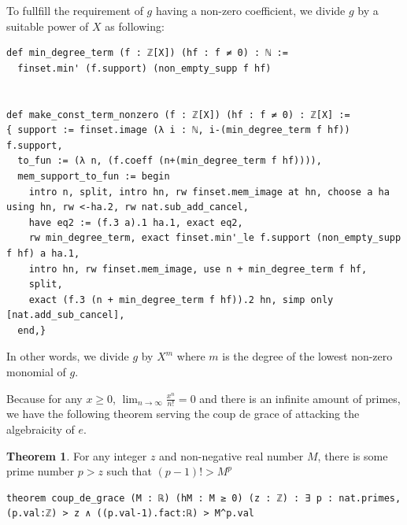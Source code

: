 \documentclass{report}
\theoremstyle{definition}
\newtheorem{theorem}{Theorem}[section]
\newenvironment{code}{\captionsetup{type=listing}}{}
\begin{document}
To fullfill the requirement of $g$ having a non-zero coefficient, we divide $g$ by a suitable power of $X$ as following:
\begin{code}
\begin{verbatim}
def min_degree_term (f : ℤ[X]) (hf : f ≠ 0) : ℕ := 
  finset.min' (f.support) (non_empty_supp f hf)


def make_const_term_nonzero (f : ℤ[X]) (hf : f ≠ 0) : ℤ[X] := 
{ support := finset.image (λ i : ℕ, i-(min_degree_term f hf)) f.support,
  to_fun := (λ n, (f.coeff (n+(min_degree_term f hf)))),
  mem_support_to_fun := begin
    intro n, split, intro hn, rw finset.mem_image at hn, choose a ha using hn, rw <-ha.2, rw nat.sub_add_cancel,
    have eq2 := (f.3 a).1 ha.1, exact eq2,
    rw min_degree_term, exact finset.min'_le f.support (non_empty_supp f hf) a ha.1,
    intro hn, rw finset.mem_image, use n + min_degree_term f hf,
    split,
    exact (f.3 (n + min_degree_term f hf)).2 hn, simp only [nat.add_sub_cancel],
  end,}
\end{verbatim}

In other words, we divide $g$ by $X^m$ where $m$ is the degree of the lowest non-zero monomial of $g$.
\end{code}

Because for any $x\ge 0$, $\lim_{n\to\infty}\frac{x^n}{n!}=0$ and there is an infinite amount of primes, we have the following theorem serving the coup de grace of attacking the algebraicity of $e$.
\begin{theorem}
For any integer $z$ and non-negative real number $M$, there is some prime number $p>z$ such that $(p-1)!>M^p$
\begin{verbatim}
theorem coup_de_grace (M : ℝ) (hM : M ≥ 0) (z : ℤ) : ∃ p : nat.primes, (p.val:ℤ) > z ∧ ((p.val-1).fact:ℝ) > M^p.val
\end{verbatim} 
\end{theorem}
\end{document}
